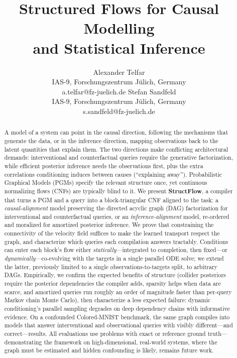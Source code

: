 \documentclass{article}
\title{\texorpdfstring{Structured Flows for Causal Modelling\\ and Statistical Inference}{Structured Flows for Causal Modelling and Statistical Inference}}
\author{%
  \name Alexander Telfar \\
  \addr IAS-9, Forschungszentrum Jülich, Germany \\
  \email a.telfar@fz-juelich.de
  \tmlrAND
  \name Stefan Sandfeld \\
  \addr IAS-9, Forschungszentrum Jülich, Germany \\
  \email s.sandfeld@fz-juelich.de
}
\theoremstyle{plain}
\theoremstyle{definition}
\theoremstyle{remark}
\newif\ifmarkrev \markrevtrue
\newcommand{\rev}[1]{\ifmarkrev{\color{revblue}#1}\else#1\fi}
\newif\ifmarkcam \markcamtrue
\newcommand{\cam}[1]{\ifmarkcam{\color{camgreen}#1}\else#1\fi}
\begin{document}
\maketitle

\begin{abstract}
A model of a system can point in the causal direction, following the mechanisms that generate the data, or in the inference direction, mapping observations back to the latent quantities that explain them. The two directions make conflicting architectural demands: interventional and counterfactual queries require the generative factorization, while efficient posterior inference needs the observations first, plus the extra correlations conditioning induces between causes (``explaining away''). Probabilistic Graphical Models (PGMs) specify the relevant structure once, yet continuous normalizing flows (CNFs) are typically blind to it. We present \textbf{StructFlow}, a compiler that turns a PGM and a query into a block-triangular CNF aligned to the task: a \emph{causal-alignment} model preserving the directed acyclic graph (DAG) factorization for interventional and counterfactual queries, or an \emph{inference-alignment} model, re-ordered and moralized for amortized posterior inference. We prove that constraining the connectivity of the velocity field suffices to make the learned transport respect the graph, and characterize which queries each compilation answers tractably. Conditions can enter each block's flow either \emph{statically}---integrated to completion, then fixed---or \emph{dynamically}---co-evolving with the targets in a single parallel ODE solve; we extend the latter, previously limited to a single observations-to-targets split, to arbitrary DAGs. Empirically, we confirm the expected benefits of structure (\rev{collider posteriors require the posterior dependencies the compiler adds}, sparsity helps when data are scarce, and amortized queries run roughly an order of magnitude faster than per-query Markov chain Monte Carlo), then characterize a less expected failure: dynamic conditioning's parallel sampling degrades on deep dependency chains with informative evidence. On a confounded Colored-MNIST benchmark, the same graph compiles into models that answer interventional and observational queries with visibly different---and correct---results. \cam{All evaluations use problems with exact or reference ground truth---demonstrating the framework on high-dimensional, real-world systems, where the graph must be estimated and hidden confounding is likely, remains future work.}
\end{abstract}
\end{document}
